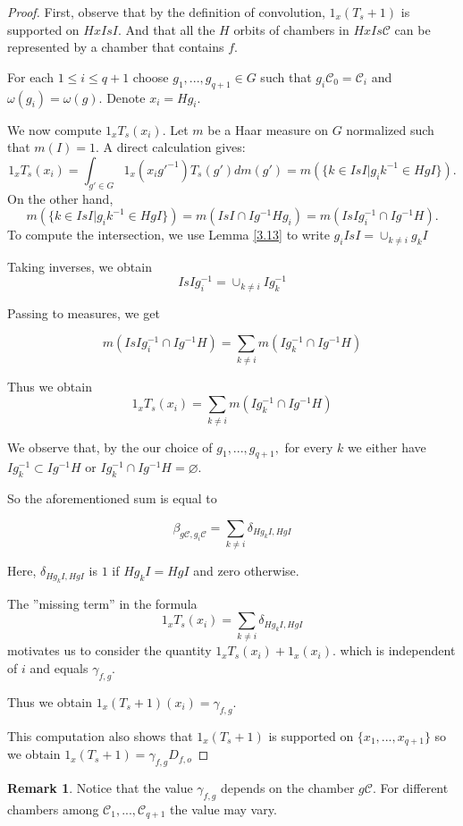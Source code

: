 \documentclass[12pt]{article}
\newcommand{\C}{\mathcal{C}}
\newcommand{\<}{\langle}
\renewcommand{\>}{\rangle}
\renewcommand{\emptyset}{\varnothing}
\theoremstyle{plain}
\theoremstyle{definition}
\newtheorem{Remark}[theorem]{Remark}
\begin{document}
\begin{proof}

First, observe that by the definition of convolution, $1_x(T_s+1)$ is supported on $HxIsI$. And that all the $H$ orbits of chambers in $HxIs\C$ can be represented by a chamber that contains $f$.

For each $1\leq i\leq q+1$ choose $g_1,...,g_{q+1}\in G$ such that $g_i\C_0=\C_i$ and $\omega(g_i)=\omega(g)$. Denote $x_i=Hg_i$.

We now compute $1_{x}T_s(x_i)$.
Let $m$ be a Haar measure on $G$ normalized such that $m(I)=1.$
A direct calculation gives:
$$1_{x}T_s(x_i)=\int_{g'\in G} 1_{x}(x_ig'^{-1})T_s(g')dm(g')=m(\{k\in IsI|g_ik^{-1}\in HgI\}).$$ 
On the other hand, 
$$m(\{k\in IsI|g_ik^{-1}\in HgI\})=m(IsI\cap Ig^{-1}Hg_i)=m(IsIg^{-1}_i\cap Ig^{-1}H).$$
To compute the intersection, we use Lemma \ref{3.13} to write $g_iIsI=\cup_{k\neq i}g_kI$

Taking inverses, we obtain $$IsIg^{-1}_i=\cup_{k\neq i}Ig^{-1}_k$$

Passing to measures, we get

$$m(IsIg^{-1}_i\cap Ig^{-1}H)=\sum_{k\neq i}m(Ig^{-1}_k\cap Ig^{-1}H)$$

Thus we obtain
 $$1_{x}T_s(x_i)=\sum_{k\neq i}m(Ig^{-1}_k\cap Ig^{-1}H)$$


We observe that, by the our choice of $g_{1},...,g_{q+1},$ for every $k$ we either have $Ig_k^{-1}\subset Ig^{-1}H$ or $Ig_k^{-1}\cap Ig^{-1}H=\emptyset.$

So the aforementioned sum is equal to

\[
    \beta_{g\C,g_i\C}=\sum_{k\neq i}\delta_{Hg_kI,HgI} \label{eq:special} \tag{*}
\]

Here, $\delta_{Hg_kI,HgI}$ is $1$ if $Hg_kI=HgI$ and zero otherwise.

The ''missing term'' in the formula 
$$1_{x}T_s(x_i)=\sum_{k\neq i}\delta_{Hg_kI,HgI}$$ motivates us to consider the quantity 
$1_{x}T_s(x_i)+1_{x}(x_{i}).$ which is independent of $i$ and equals $\gamma_{f,g}$.

Thus we obtain $1_x(T_s+1)(x_i)=\gamma_{f,g}$.

This computation also shows that $1_x(T_s+1)$ is supported on $\{x_1,...,x_{q+1}\}$ so we obtain $1_x(T_s+1)=\gamma_{f,g} D_{f,o}$
\end{proof}

\begin{Remark}
    Notice that the value $\gamma_{f,g}$ depends on the chamber $g\C$. For different chambers among $\C_1,...,\C_{q+1}$ the value may vary.
\end{Remark}
\end{document}
